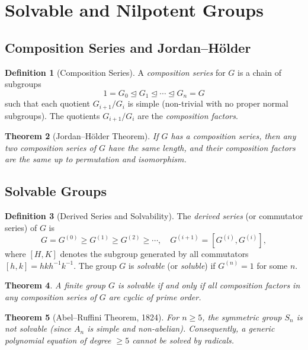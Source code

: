 \documentclass[12pt,a4paper]{amsart}
\newtheorem{theorem}{Theorem}[section]
\theoremstyle{definition}
\newtheorem{definition}[theorem]{Definition}
\begin{document}
\section{Solvable and Nilpotent Groups}
\label{sec:solvable}

\subsection{Composition Series and Jordan--H\"{o}lder}

\begin{definition}[Composition Series]
A \emph{composition series} for $G$ is a chain of subgroups
\[
  1 = G_0 \trianglelefteq G_1 \trianglelefteq \cdots \trianglelefteq G_n = G
\]
such that each quotient $G_{i+1}/G_i$ is simple (non-trivial with no proper normal
subgroups). The quotients $G_{i+1}/G_i$ are the \emph{composition factors}.
\end{definition}

\begin{theorem}[Jordan--H\"{o}lder Theorem]
\label{thm:jordan_holder}
If $G$ has a composition series, then any two composition series of $G$ have the same
length, and their composition factors are the same up to permutation and isomorphism.
\end{theorem}

\subsection{Solvable Groups}

\begin{definition}[Derived Series and Solvability]
The \emph{derived series} (or commutator series) of $G$ is
\[
  G = G^{(0)} \geq G^{(1)} \geq G^{(2)} \geq \cdots,
  \quad G^{(i+1)} = [G^{(i)}, G^{(i)}],
\]
where $[H, K]$ denotes the subgroup generated by all commutators $[h,k] = hkh^{-1}k^{-1}$.
The group $G$ is \emph{solvable} (or \emph{soluble}) if $G^{(n)} = 1$ for some $n$.
\end{definition}

\begin{theorem}
A finite group $G$ is solvable if and only if all composition factors in any composition
series of $G$ are cyclic of prime order.
\end{theorem}

\begin{theorem}[Abel--Ruffini Theorem, 1824]
\label{thm:abel_ruffini}
For $n \geq 5$, the symmetric group $S_n$ is \emph{not} solvable (since
$A_n$ is simple and non-abelian). Consequently, a generic polynomial equation of
degree $\geq 5$ cannot be solved by radicals.
\end{theorem}
\end{document}
